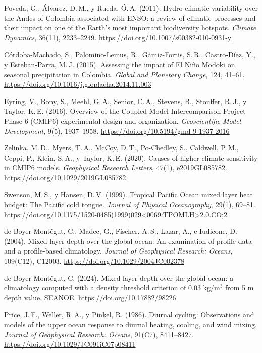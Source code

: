 \documentclass[12pt, letterpaper]{article}
\begin{document}
	\noindent [3] Poveda, G., \'Alvarez, D.\,M., y Rueda, \'O.\,A. (2011). Hydro-climatic
	variability over the Andes of Colombia associated with ENSO: a review of climatic processes
	and their impact on one of the Earth's most important biodiversity hotspots.
	\textit{Climate Dynamics}, 36(11), 2233--2249.
	\url{https://doi.org/10.1007/s00382-010-0931-y}
	
	\noindent [4] C\'ordoba-Machado, S., Palomino-Lemus, R., G\'amiz-Fortis, S.\,R.,
	Castro-D\'iez, Y., y Esteban-Parra, M.\,J. (2015). Assessing the impact of El Ni\~no Modoki
	on seasonal precipitation in Colombia. \textit{Global and Planetary Change}, 124, 41--61.
	\url{https://doi.org/10.1016/j.gloplacha.2014.11.003}
	
	\noindent [5] Eyring, V., Bony, S., Meehl, G.\,A., Senior, C.\,A., Stevens, B., Stouffer,
	R.\,J., y Taylor, K.\,E. (2016). Overview of the Coupled Model Intercomparison Project
	Phase 6 (CMIP6) experimental design and organization. \textit{Geoscientific Model
		Development}, 9(5), 1937--1958.
	\url{https://doi.org/10.5194/gmd-9-1937-2016}
	
	\noindent [6] Zelinka, M.\,D., Myers, T.\,A., McCoy, D.\,T., Po-Chedley, S., Caldwell,
	P.\,M., Ceppi, P., Klein, S.\,A., y Taylor, K.\,E. (2020). Causes of higher climate
	sensitivity in CMIP6 models. \textit{Geophysical Research Letters}, 47(1), e2019GL085782.
	\url{https://doi.org/10.1029/2019GL085782}
	
	\noindent [7] Swenson, M.\,S., y Hansen, D.\,V. (1999). Tropical Pacific Ocean mixed layer
	heat budget: The Pacific cold tongue. \textit{Journal of Physical Oceanography}, 29(1),
	69--81.
	\url{https://doi.org/10.1175/1520-0485(1999)029<0069:TPOMLH>2.0.CO;2}
	
	\noindent [8] de Boyer Mont\'egut, C., Madec, G., Fischer, A.\,S., Lazar, A., e Iudicone,
	D. (2004). Mixed layer depth over the global ocean: An examination of profile data and a
	profile-based climatology. \textit{Journal of Geophysical Research: Oceans}, 109(C12),
	C12003.
	\url{https://doi.org/10.1029/2004JC002378}
	
	\noindent [9] de Boyer Mont\'egut, C. (2024). Mixed layer depth over the global ocean: a
	climatology computed with a density threshold criterion of 0.03 kg/m$^3$ from 5 m depth
	value. SEANOE.
	\url{https://doi.org/10.17882/98226}
	
	\noindent [10] Price, J.\,F., Weller, R.\,A., y Pinkel, R. (1986). Diurnal cycling:
	Observations and models of the upper ocean response to diurnal heating, cooling, and wind
	mixing. \textit{Journal of Geophysical Research: Oceans}, 91(C7), 8411--8427.
	\url{https://doi.org/10.1029/JC091iC07p08411}
	
\end{document}
